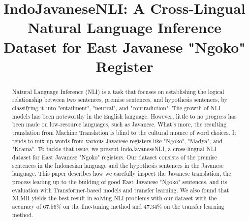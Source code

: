 \documentclass[a4paper, conference]{IEEEtran}
\begin{document}
\title{IndoJavaneseNLI: A Cross-Lingual Natural Language Inference Dataset for East Javanese "Ngoko" Register\\
}

\author{
\and
\and
{}
}

\maketitle

\begin{abstract}
Natural Language Inference (NLI) is a task that focuses on establishing the logical relationship between two sentences, premise sentences, and hypothesis sentences, by classifying it into "entailment", "neutral", and "contradiction". The growth of NLI models has been noteworthy in the English language. However, little to no progress has been made on low-resource languages, such as Javanese. What's more, the resulting translation from Machine Translation is blind to the cultural nuance of word choices. It tends to mix up words from various Javanese registers like "Ngoko", "Madya", and "Krama". To tackle that issue, we present IndoJavaneseNLI, a cross-lingual NLI dataset for East Javanese "Ngoko" registers. Our dataset consists of the premise sentences in the Indonesian language and the hypothesis sentences in the Javanese language. This paper describes how we carefully inspect the Javanese translation, the process leading up to the building of good East Javanese "Ngoko" sentences, and its evaluation with Transformer-based models and transfer learning. We also found that XLMR yields the best result in solving NLI problems with our dataset with the accuracy of $67.56\%$ on the fine-tuning method and $47.34\%$ on the transfer learning method.
\end{abstract}
\end{document}
